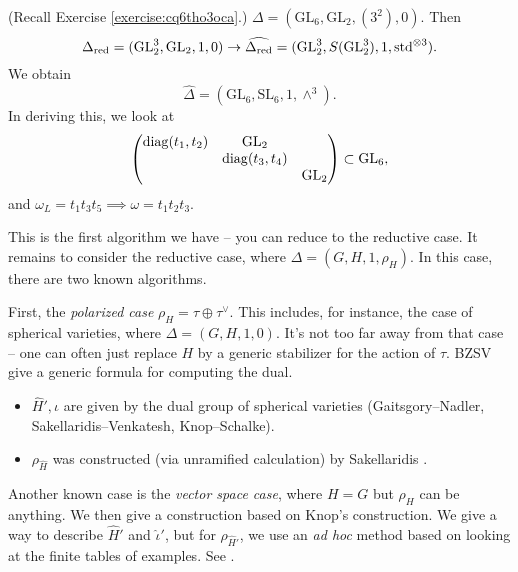 \documentclass[reqno]{amsart} 
\numberwithin{theorem}{section}
\numberwithin{equation}{section}
\numberwithin{exercise}{section}
\begin{document}
\begin{example}
  (Recall Exercise \ref{exercise:cq6tho3oca}.)  $\Delta =(\mathrm{GL}_6, \mathrm{GL}_2,(3^2), 0)$.  Then
  \begin{equation*}
    \Delta_{\operatorname{red}} =(\mathrm{GL}_2^3, \mathrm{GL}_2, 1, 0)
    \rightarrow \widehat{\Delta_{\operatorname{red}}} = (\mathrm{GL}_2^3, S(\mathrm{GL}_2^3), 1, \mathrm{std}^{\otimes 3}).
  \end{equation*}
  We obtain
  \begin{equation*}
    \hat{\Delta} =(\mathrm{GL}_6, \mathrm{SL}_6, 1, \wedge^3).
  \end{equation*}
  In deriving this, we look at
  \begin{equation*}
    \begin{pmatrix}
      \operatorname{diag}(t_1, t_2)      &  \mathrm{GL}_2 &  \\
                           & \operatorname{diag}(t_3, t_4) &  \\
                           &  &  \mathrm{GL}_2 \\
    \end{pmatrix}
    \subset \mathrm{GL}_6,
  \end{equation*}
  and $\omega_{L} = t_1 t_3 t_5 \implies \omega = t_1 t_2 t_3$.
\end{example}

This is the first algorithm we have -- you can reduce to the reductive case.  It remains to consider the reductive case, where $\Delta =(G, H, 1, \rho_H)$.  In this case, there are two known algorithms.

First, the \emph{polarized case} $\rho_H = \tau \oplus \tau^\vee$.  This includes, for instance, the case of spherical varieties, where $\Delta =(G, H, 1, 0)$.  It's not too far away from that case -- one can often just replace $H$ by a generic stabilizer for the action of $\tau$.  BZSV give a generic formula for computing the dual.
\begin{itemize}
\item $\hat{H}', \iota$ are given by the dual group of spherical varieties (Gaitsgory--Nadler, Sakellaridis--Venkatesh, Knop--Schalke).
\item $\rho_{\hat{H}}$ was constructed (via unramified calculation) by Sakellaridis \cite{MR3117308}.
\end{itemize}

Another known case is the \emph{vector space case}, where $H = G$ but $\rho_H$ can be anything.  We then give a construction based on Knop's construction.  We give a way to describe $\hat{H}'$ and $\hat{\iota}'$, but for $\rho_{\hat{H}'}$, we use an \emph{ad hoc} method based on looking at the finite tables of examples.  See \cite{2023arXiv2310.17837}.
\end{document}
